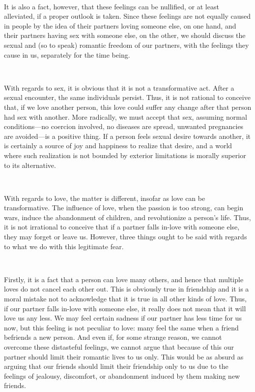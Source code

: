 \documentclass[a4paper, 12pt]{article}
\begin{document}
~ 

It is also a fact, however, that these feelings can be nullified, or at least
alleviated, if a proper outlook is taken. Since these feelings are not equally 
caused in people by the idea of their partners loving someone else, on one hand,
and their partners having sex with someone else, on the other, we should discuss 
the sexual and (so to speak) romantic freedom of our partners, with the
feelings they cause in us, separately for the time being.

~ 

With regards to sex, it is obvious that it is not a transformative act. After a
sexual encounter, the same individuals persist. Thus, it is not rational to
conceive that, if we love another person, this love could suffer any change
after that person had sex with another. More radically, we must accept that 
sex, assuming normal conditions---no coercion involved, no diseases are spread,
unwanted pregnancies are avoided---is a positive thing. If a person feels sexual 
desire towards another, it is certainly a source of joy and happiness to
realize that desire, and a world where such realization is not bounded by
exterior limitations is morally superior to its alternative. 

~ 

With regards to love, the matter is different, insofar as love can be
transformative. The influence of love, when the passion is too strong, can
begin wars, induce the abandonment of children, and revolutionize a person's
life. Thus, it is not irrational to conceive that if a partner falls in-love
with someone else, they may forget or leave us. However, three things ought to
be said with regards to what we do with this legitimate fear.

~ 

Firstly, it is a fact that a person can love many others, and hence that
multiple loves do not cancel each other out. This is obviously true in 
friendship and it is a moral mistake not to acknowledge that it is true in 
all other kinds of love. Thus, if our partner falls in-love with someone else,
it really does not mean that it will love us any less. We may feel certain
sadness if our partner has less time for us now, but this feeling is not
peculiar to love: many feel the same when a friend befriends a new person. And
even if, for some strange reason, we cannot overcome these distasteful
feelings, we cannot argue that because of this our partner should limit their romantic 
lives to us only. This would be as absurd as arguing that our friends should
limit their friendship only to us due to the feelings of jealousy, discomfort, or 
abandonment induced by them making new friends.
\end{document}
